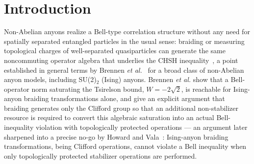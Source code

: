 \documentclass[aps,pra,twocolumn,superscriptaddress,floatfix,nofootinbib]{revtex4-2}
\begin{document}

\maketitle

\section{Introduction}
\label{sec:intro}

Non-Abelian anyons realize a Bell-type correlation structure without
any need for spatially separated entangled particles in the usual
sense: braiding or measuring topological charges of well-separated
quasiparticles can generate the same noncommuting operator algebra
that underlies the CHSH inequality~\cite{CHSH1969,Cirelson1980}, a
point established in general terms by Brennen \emph{et
al.}~\cite{Brennen2009} for a broad class of non-Abelian anyon models,
including SU(2)$_2$ (Ising) anyons. Brennen \emph{et al.} show that a
Bell-operator norm saturating the Tsirelson bound,
$W=-2\sqrt2$, is reachable for Ising-anyon braiding transformations
alone, and give an explicit argument that braiding generates only the
Clifford group so that an additional non-stabilizer resource is required
to convert this algebraic saturation into an actual Bell-inequality
violation with topologically protected operations --- an argument later
sharpened into a precise no-go by Howard and
Vala~\cite{HowardVala2012}: Ising-anyon braiding transformations,
being Clifford operations, cannot violate a Bell inequality when only
topologically protected stabilizer operations are performed.
\end{document}
